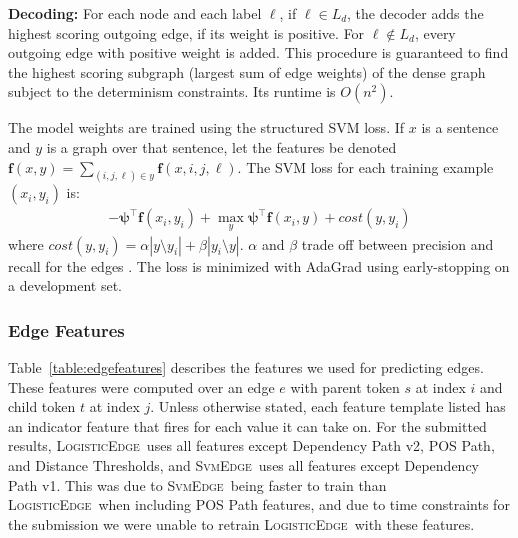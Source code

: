 \documentclass[11pt]{article}
\newcommand{\sam}[1]{\textcolor{blue}{[#1 -SMT]}}
\renewcommand{\sam}[1]{}
\newcommand{\logitedge}{\textsc{LogisticEdge}}
\newcommand{\svmedge}{\textsc{SvmEdge}}
\begin{document}
\noindent
\textbf{Decoding:} For each node and each label $\ell$, if $\ell \in L_d$, the
decoder adds the highest scoring outgoing edge, if its weight is positive.
For $\ell \not\in L_d$, every outgoing edge with positive weight is added.
This procedure is guaranteed to find the highest scoring subgraph (largest sum
of edge weights) of the dense graph subject to the determinism constraints.
Its runtime is $O(n^2)$.



The model weights are trained using the structured SVM loss.  If $x$
is a sentence and $y$ is a graph over that sentence, let the features 
be denoted $\bm{f}(x,y) = \sum_{(i,j,\ell) \in y}
\bm{f}(x, i,j,\ell)$.  The SVM loss for each training example $(x_i, y_i)$ is:
\begin{multline*}
-\bm\psi^\top \bm{f}(x_i,y_i) + \max_{y} \bm\psi^\top \bm{f}(x_i,y) +
\mathit{cost}(y,y_i)
\end{multline*}
where $\mathit{cost}(y,y_i) = \alpha |y\setminus y_i| +
\beta |y_i\setminus y|$.
$\alpha$ and $\beta$ trade off between precision and recall for the
edges \citep{gimpel_softmax-margin_2010}.
The loss is minimized with AdaGrad
using early-stopping on a development set. %


\subsubsection{Edge Features}
\label{s:edgefeatures}

\label{s:features}

\sam{would be nice to cite where we stole these features from, where applicable}
Table~\ref{table:edgefeatures} describes the features we used for predicting
edges.
These features were computed over an edge $e$ with parent token $s$ at
index $i$ and child token $t$ at index $j$. 
Unless otherwise stated, each feature template listed has an indicator
feature that fires for each value it can take on.  For the submitted results,
\logitedge~uses all features except Dependency Path v2, POS Path, and Distance
Thresholds, and \svmedge~uses all features except Dependency
Path v1.  This was due to \svmedge~being faster to
train than \logitedge~when including POS Path features, and due to time constraints for the submission we were unable to retrain
\logitedge~with these features.
\end{document}
